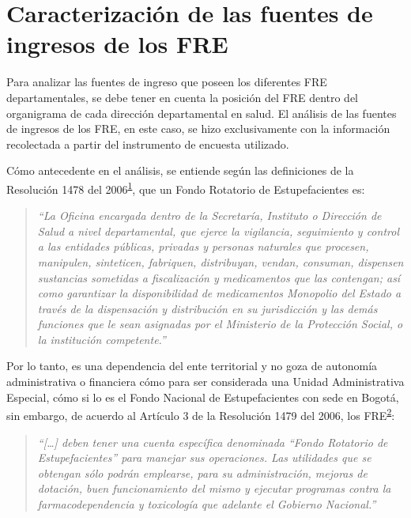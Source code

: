 \documentclass[
]{book}
\begin{document}
\hypertarget{caracterizaciuxf3n-de-las-fuentes-de-ingresos-de-los-fre}{%
\section{Caracterización de las fuentes de ingresos de los FRE}\label{caracterizaciuxf3n-de-las-fuentes-de-ingresos-de-los-fre}}

Para analizar las fuentes de ingreso que poseen los diferentes FRE departamentales, se debe tener en cuenta la posición del FRE dentro del organigrama de cada dirección departamental en salud. El análisis de las fuentes de ingresos de los FRE, en este caso, se hizo exclusivamente con la información recolectada a partir del instrumento de encuesta utilizado.

Cómo antecedente en el análisis, se entiende según las definiciones de la Resolución 1478 del 2006\textsuperscript{\protect\hyperlink{ref-MSPS1478-2006}{1}}, que un Fondo Rotatorio de Estupefacientes es:

\begin{quote}
\emph{``La Oficina encargada dentro de la Secretaría, Instituto o Dirección de Salud a nivel departamental, que ejerce la vigilancia, seguimiento y control a las entidades públicas, privadas y personas naturales que procesen, manipulen, sinteticen, fabriquen, distribuyan, vendan, consuman, dispensen sustancias sometidas a fiscalización y medicamentos que las contengan; así como garantizar la disponibilidad de medicamentos Monopolio del Estado a través de la dispensación y distribución en su jurisdicción y las demás funciones que le sean asignadas por el Ministerio de la Protección Social, o la institución competente.''}
\end{quote}

Por lo tanto, es una dependencia del ente territorial y no goza de autonomía administrativa o financiera cómo para ser considerada una Unidad Administrativa Especial, cómo si lo es el Fondo Nacional de Estupefacientes con sede en Bogotá, sin embargo, de acuerdo al Artículo 3 de la Resolución 1479 del 2006, los FRE\textsuperscript{\protect\hyperlink{ref-MSPS1479-2006}{2}}:

\begin{quote}
\emph{``{[}\ldots{]} deben tener una cuenta específica denominada ``Fondo Rotatorio de Estupefacientes'' para manejar sus operaciones. Las utilidades que se obtengan sólo podrán emplearse, para su administración, mejoras de dotación, buen funcionamiento del mismo y ejecutar programas contra la farmacodependencia y toxicología que adelante el Gobierno Nacional.''}
\end{quote}
\end{document}
